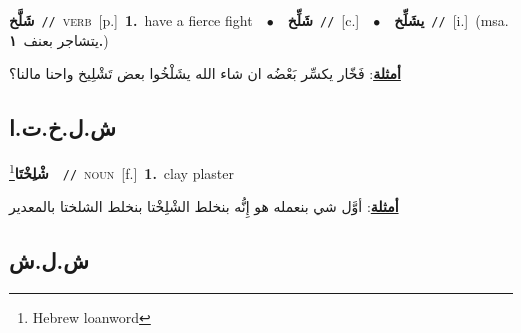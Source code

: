 \documentclass[10pt,a4paper,twoside]{article} %
\begin{document}
\begin{multicols}{2}
{\setlength\topsep{0pt}\textbf{\foreignlanguage{arabic}{شَلَّخ}}\ {\color{gray}\texttt{//}\color{black}}\ \textsc{verb}\ [p.]\ \textbf{1.}~have a fierce fight\ \ $\bullet$\ \ \setlength\topsep{0pt}\textbf{\foreignlanguage{arabic}{شَلِّخ}}\ {\color{gray}\texttt{//}\color{black}}\ [c.]\ \ $\bullet$\ \ \setlength\topsep{0pt}\textbf{\foreignlanguage{arabic}{يشَلِّخ}}\ {\color{gray}\texttt{//}\color{black}}\ [i.]\ \color{gray}(msa. \foreignlanguage{arabic}{يتشاجر بعنف}~\foreignlanguage{arabic}{\textbf{١.}})\color{black}\  \begin{flushright}\color{gray}\foreignlanguage{arabic}{\textbf{\underline{\foreignlanguage{arabic}{أمثلة}}}: فَخّار يكسِّر بَعْضُه ان شاء الله يشَلْخُوا بعض تَشْلِيخ واحنا مالنا؟}\end{flushright}\color{black}} \vspace{2mm}

\vspace{-3mm}
\subsection*{\color{blue}\foreignlanguage{arabic}{ش.ل.خ.ت.ا}\color{blue}{ (ntws)}} 

{\setlength\topsep{0pt}\textbf{\foreignlanguage{arabic}{شْلِخْتَا}}\footnote{Hebrew loanword}\ \ {\color{gray}\texttt{//}\color{black}}\ \textsc{noun}\ [f.]\ \textbf{1.}~clay plaster\  \begin{flushright}\color{gray}\foreignlanguage{arabic}{\textbf{\underline{\foreignlanguage{arabic}{أمثلة}}}: أوَّل شي بنعمله هو إِنُّه بنخلط الشْلِخْتا بنخلط الشلختا بالمعدير}\end{flushright}\color{black}} \vspace{2mm}

\vspace{-3mm}
\subsection*{\color{blue}\foreignlanguage{arabic}{ش.ل.ش}\color{blue}{}} 


\end{multicols}
\end{document}
